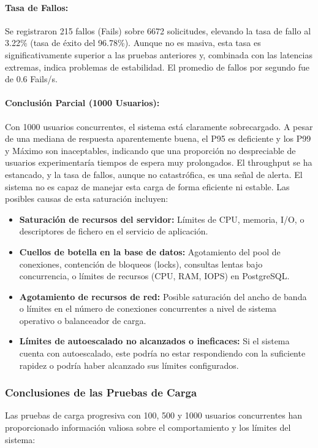 \paragraph{Tasa de Fallos:}
Se registraron 215 fallos (Fails) sobre 6672 solicitudes, elevando la tasa de fallo al 3.22\% (tasa de éxito del 96.78\%). Aunque no es masiva, esta tasa es significativamente superior a las pruebas anteriores y, combinada con las latencias extremas, indica problemas de estabilidad. El promedio de fallos por segundo fue de 0.6 Fails/s.

\paragraph{Conclusión Parcial (1000 Usuarios):}
Con 1000 usuarios concurrentes, el sistema está claramente sobrecargado. A pesar de una mediana de respuesta aparentemente buena, el P95 es deficiente y los P99 y Máximo son inaceptables, indicando que una proporción no despreciable de usuarios experimentaría tiempos de espera muy prolongados. El throughput se ha estancado, y la tasa de fallos, aunque no catastrófica, es una señal de alerta. El sistema no es capaz de manejar esta carga de forma eficiente ni estable. Las posibles causas de esta saturación incluyen:
\begin{itemize}
    \item \textbf{Saturación de recursos del servidor:} Límites de CPU, memoria, I/O, o descriptores de fichero en el servicio de aplicación.
    \item \textbf{Cuellos de botella en la base de datos:} Agotamiento del pool de conexiones, contención de bloqueos (locks), consultas lentas bajo concurrencia, o límites de recursos (CPU, RAM, IOPS) en PostgreSQL.
    \item \textbf{Agotamiento de recursos de red:} Posible saturación del ancho de banda o límites en el número de conexiones concurrentes a nivel de sistema operativo o balanceador de carga.
    \item \textbf{Límites de autoescalado no alcanzados o ineficaces:} Si el sistema cuenta con autoescalado, este podría no estar respondiendo con la suficiente rapidez o podría haber alcanzado sus límites configurados.
\end{itemize}

\subsubsection{Conclusiones de las Pruebas de Carga}
Las pruebas de carga progresiva con 100, 500 y 1000 usuarios concurrentes han proporcionado información valiosa sobre el comportamiento y los límites del sistema:

